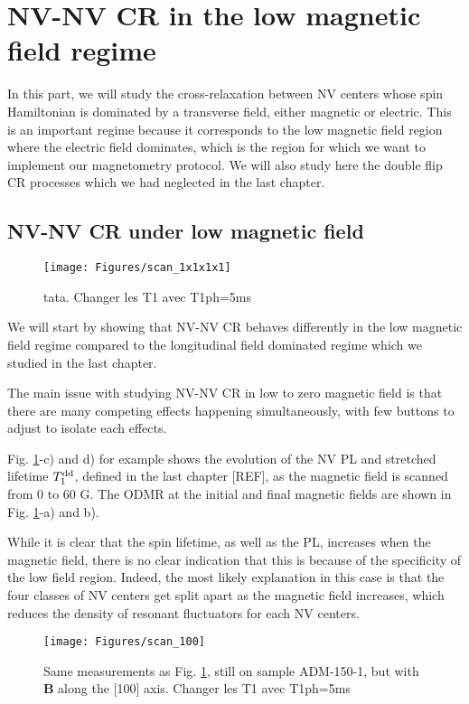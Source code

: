 \documentclass[a4paper,11pt]{report}
\begin{document}
\section{NV-NV CR in the low magnetic field regime}
In this part, we will study the cross-relaxation between NV centers whose spin Hamiltonian is dominated by a transverse field, either magnetic or electric. This is an important regime because it corresponds to the low magnetic field region where the electric field dominates, which is the region for which we want to implement our magnetometry protocol. We will also study here the double flip CR processes which we had neglected in the last chapter.

\subsection{NV-NV CR under low magnetic field}
\begin{figure}[h]
\centering
\texttt{[image: Figures/scan\_1x1x1x1]}
\caption{tata. Changer les T1 avec T1ph=5ms}
\label{scan 1x1x1x1}
\end{figure}
We will start by showing that NV-NV CR behaves differently in the low magnetic field regime compared to the longitudinal field dominated regime which we studied in the last chapter.

The main issue with studying NV-NV CR in low to zero magnetic field is that there are many competing effects happening simultaneously, with few buttons to adjust to isolate each effects.

Fig. \ref{scan 1x1x1x1}-c) and d) for example shows the evolution of the NV PL and stretched lifetime $T_1^{\rm dd}$, defined in the last chapter [REF], as the magnetic field is scanned from 0 to 60 G. The ODMR at the initial and final magnetic fields are shown in Fig. \ref{scan 1x1x1x1}-a) and b).

While it is clear that the spin lifetime, as well as the PL, increases when the magnetic field, there is no clear indication that this is because of the specificity of the low field region. Indeed, the most likely explanation in this case is that the four classes of NV centers get split apart as the magnetic field increases, which reduces the density of resonant fluctuators for each NV centers.

\begin{figure}[h]
\centering
\texttt{[image: Figures/scan\_100]}
\caption{Same measurements as Fig. \ref{scan 1x1x1x1}, still on sample ADM-150-1, but with $\mathbf{B}$ along the [100] axis. Changer les T1 avec T1ph=5ms}
\label{scan 100}
\end{figure}
\end{document}
